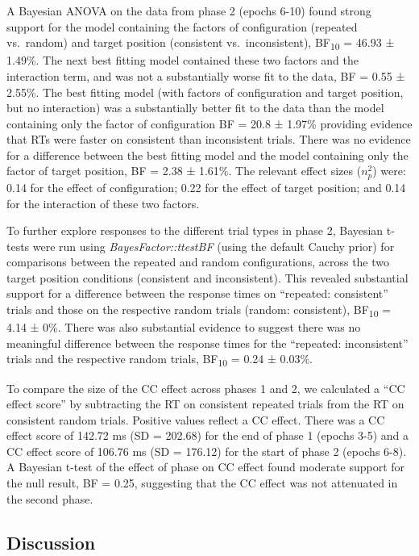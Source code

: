 \documentclass[
  man,
  floatsintext,
  longtable,
  nolmodern,
  notxfonts,
  notimes,
  colorlinks=true,linkcolor=blue,citecolor=blue,urlcolor=blue]{apa7}
\begin{document}
A Bayesian ANOVA on the data from phase 2 (epochs 6-10) found strong
support for the model containing the factors of configuration (repeated
vs.~random) and target position (consistent vs.~inconsistent),
BF\textsubscript{10} = 46.93 ± 1.49\%. The next best fitting model
contained these two factors and the interaction term, and was not a
substantially worse fit to the data, BF = 0.55 ± 2.55\%. The best
fitting model (with factors of configuration and target position, but no
interaction) was a substantially better fit to the data than the model
containing only the factor of configuration BF = 20.8 ± 1.97\% providing
evidence that RTs were faster on consistent than inconsistent trials.
There was no evidence for a difference between the best fitting model
and the model containing only the factor of target position, BF = 2.38 ±
1.61\%. The relevant effect sizes (\(n^2_p\)) were: 0.14 for the effect
of configuration; 0.22 for the effect of target position; and 0.14 for
the interaction of these two factors.

To further explore responses to the different trial types in phase 2,
Bayesian t-tests were run using \emph{BayesFactor::ttestBF} (using the
default Cauchy prior) for comparisons between the repeated and random
configurations, across the two target position conditions (consistent
and inconsistent). This revealed substantial support for a difference
between the response times on ``repeated: consistent'' trials and those
on the respective random trials (random: consistent),
BF\textsubscript{10} = 4.14 ± 0\%. There was also substantial evidence
to suggest there was no meaningful difference between the response times
for the ``repeated: inconsistent'' trials and the respective random
trials, BF\textsubscript{10} = 0.24 ± 0.03\%.

To compare the size of the CC effect across phases 1 and 2, we
calculated a ``CC effect score'' by subtracting the RT on consistent
repeated trials from the RT on consistent random trials. Positive values
reflect a CC effect. There was a CC effect score of 142.72 ms (SD =
202.68) for the end of phase 1 (epochs 3-5) and a CC effect score of
106.76 ms (SD = 176.12) for the start of phase 2 (epochs 6-8). A
Bayesian t-test of the effect of phase on CC effect found moderate
support for the null result, BF = 0.25, suggesting that the CC effect
was not attenuated in the second phase.

\subsection{Discussion}\label{discussion}
\end{document}
